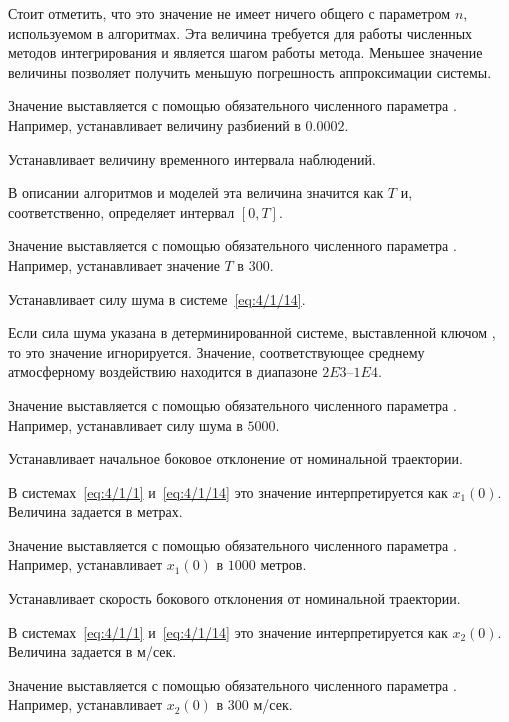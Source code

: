 		Стоит отметить, что это значение не имеет ничего общего с параметром $n$, используемом в алгоритмах. Эта величина требуется для работы численных методов интегрирования и является шагом работы метода. Меньшее значение величины позволяет получить меньшую погрешность аппроксимации системы.
		
		Значение выставляется с помощью обязательного численного параметра . Например,  устанавливает величину разбиений в $0.0002$.
		
	\item[\code{-t~num}]
		Устанавливает величину временного интервала наблюдений.
		
		В описании алгоритмов и моделей эта величина значится как $T$ и, соответственно, определяет интервал $[0,T]$.
		
		Значение выставляется с помощью обязательного численного параметра . Например,  устанавливает значение $T$ в $300$.
		
	\item[\code{-v~num}]
		Устанавливает силу шума в системе~\ref{eq:4/1/14}.
		
		Если сила шума указана в детерминированной системе, выставленной ключом , то это значение игнорируется. Значение, соответствующее среднему атмосферному воздействию находится в диапазоне $2E3$--$1E4$.
		
		Значение выставляется с помощью обязательного численного параметра . Например,  устанавливает силу шума в $5000$.
		
	\item[\code{-x1~num}]
		Устанавливает начальное боковое отклонение от номинальной траектории.
		
		В системах~\ref{eq:4/1/1} и~\ref{eq:4/1/14} это значение интерпретируется как $x_1(0)$. Величина задается в метрах.
		
		Значение выставляется с помощью обязательного численного параметра . Например,  устанавливает $x_1(0)$ в $1000$ метров.
		
	\item[\code{-x2~num}]
		Устанавливает скорость бокового отклонения от номинальной траектории.
		
		В системах~\ref{eq:4/1/1} и~\ref{eq:4/1/14} это значение интерпретируется как $x_2(0)$. Величина задается в м/сек.
		
		Значение выставляется с помощью обязательного численного параметра . Например,  устанавливает $x_2(0)$ в $300$ м/сек.
		
